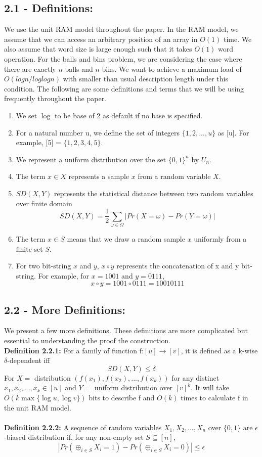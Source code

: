 \documentclass[a4paper, english]{paper}
\begin{document}
	\subsection{2.1 - Definitions:}
\quad	We use the unit RAM model throughout the paper. In the RAM model, we assume that we can access an arbitrary position of an array in $O(1)$ time. We also assume that word size is large enough such that it takes $O(1)$ word operation. For the balls and bins problem, we are considering the case where there are exactly $n$ balls and $n$ bins. We want to achieve a maximum load of $O(log n/ log log n)$ with smaller than usual description length under this condition. The following are some definitions and terms that we will be using frequently throughout the paper.
	\begin{enumerate}
	\item We set $\log$ to be base of 2 as default if no base is specified. 
	\item For a natural number u, we define the set of integers $\{1, 2, ..., u\}$ as [u].  For example, [5] = $\{1,2,3,4,5\}$.
	\item We represent a uniform distribution over the set $\{0, 1\}^n$ by $U_n$.
	\item The term $x \in X$ represents a sample $x$ from a random variable $X$.
	\item  $SD(X, Y)$ represents the statistical distance between two random variables over finite domain
		$$SD(X, Y) = \frac{1}{2}\sum_{\omega\in \Omega}| Pr(X= \omega) - Pr(Y= \omega)|$$
	\item The term $x \in S$ means that we draw a random sample $x$ uniformly from a finite set $S$.
	\item For two bit-string $x$ and $y$, $x \circ y$ represents the concatenation of x and y bit-string. For example, for $x = 1001$ and $y = 0111$, 
		$$x \circ y = 1001 \circ 0111 = 10010111$$
	\end{enumerate}
	
	\subsection{2.2 - More Definitions:}
\quad	We present a few more definitions. These definitions are more complicated but essential to understanding the proof the construction. \\
	
	\noindent\textbf{Definition 2.2.1:} 
	For a family of function f:$[u]\rightarrow[v]$, it is defined as  a k-wise $\delta$-dependent iff
		$$SD(X,Y)\le \delta$$
	For $X= $ distribution $(f(x_1),f(x_2),...,f(x_k))$ for any distinct $x_1,x_2,...,x_k\in[u]$ and $Y=$ uniform distribution over $[v]^k$.
	It will take $O(k\max\{\log u, \log v\})$ bits to describe f and $O(k)$ times to calculate f in the unit RAM model.\\\\
\textbf{Definition 2.2.2: }
	A sequence of random variables $X_1,X_2,...,X_n$ over $\{0,1\}$ are $\epsilon$-biased distribution if, for any non-empty set $S\subseteq [n]$,
	$$|Pr(\oplus_{i\in S} X_i = 1)-Pr(\oplus_{i\in S} X_i = 0)|\le \epsilon$$\\
	
\end{document}
